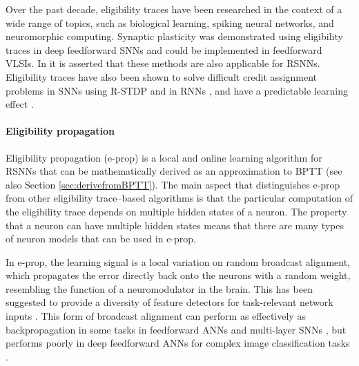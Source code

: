 	Over the past decade, eligibility traces have been researched in the context of a wide range of topics, such as biological learning, spiking neural networks, and neuromorphic computing.
	Synaptic plasticity was demonstrated using eligibility traces in deep feedforward SNNs \citep{zenke2018superspike,neftci2017event,kaiser2020synaptic} and could be implemented in feedforward VLSIs.
	In \citet{zenke2018superspike} it is asserted that these methods are also applicable for RSNNs.
	Eligibility traces have also been shown to solve difficult credit assignment problems in SNNs using R-STDP \citep{legenstein2008learning, bellec2020solution} and in RNNs \citep{he2015distinct}, and have a predictable learning effect \citep{legenstein2008learning}.

\paragraph{Eligibility propagation}
	Eligibility propagation (e-prop) \citep{bellec2020solution} is a local and online learning algorithm for RSNNs that can be mathematically derived as an approximation to BPTT (see also Section \ref{sec:derivefromBPTT}).
	The main aspect that distinguishes e-prop from other eligibility trace--based algorithms is that the particular computation of the eligibility trace depends on multiple hidden states of a neuron.
	The property that a neuron can have multiple hidden states means that there are many types of neuron models that can be used in e-prop.

	In e-prop, the learning signal is a local variation on random broadcast alignment, which propagates the error directly back onto the neurons with a random weight, resembling the function of a neuromodulator in the brain.
	This has been suggested to provide a diversity of feature detectors for task-relevant network inputs \citep{bellec2020solution}.
	This form of broadcast alignment can perform as effectively as backpropagation in some tasks in feedforward ANNs \citep{lillicrap2016random,nokland2016direct} and multi-layer SNNs \citep{samadi2017deep,clopath2010connectivity}, but performs poorly in deep feedforward ANNs for complex image classification tasks \citep{bartunov2018assessing}.


